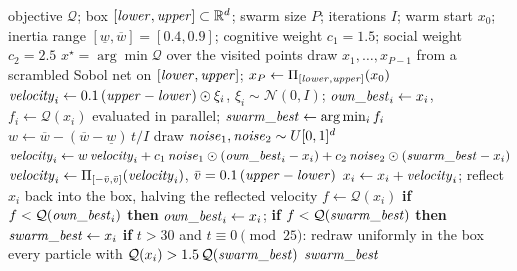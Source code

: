 \begin{algorithm}[H]
\caption{\textsc{ParticleSwarm}: particle swarm minimisation of $\mathcal{Q}$ over a box}
\label{alg:pso}
\small
\begin{algorithmic}[1]
\Require objective $\mathcal{Q}$; box $[\mathit{lower},\mathit{upper}]\subset\mathbb{R}^{d}$; swarm size
  $P$; iterations $I$; warm start $x_0$; inertia range
  $[\underline{w},\overline{w}]=[0.4,0.9]$; cognitive weight $c_1=1.5$; social weight $c_2=2.5$
\Ensure $x^\star=\arg\min \mathcal{Q}$ over the visited points
\State draw $x_1,\dots,x_{P-1}$ from a scrambled Sobol net on $[\mathit{lower},\mathit{upper}]$;\;
  $x_P\gets\Pi_{[\mathit{lower},\mathit{upper}]}(x_0)$
\State $\mathit{velocity}_i\gets 0.1\,(\mathit{upper}-\mathit{lower})\odot\xi_i$, $\xi_i\sim\mathcal N(0,I)$; \; $\mathit{own\_best}_i\gets x_i$, $f_i\gets\mathcal{Q}(x_i)$ evaluated in
  parallel; \; $\mathit{swarm\_best}\gets\arg\min_i f_i$
    \State $w\gets\overline{w}-(\overline{w}-\underline{w})\,t/I$
        \State draw $\mathit{noise}_1,\mathit{noise}_2\sim U[0,1]^d$
        \State $\mathit{velocity}_i\gets w\,\mathit{velocity}_i+c_1\, \mathit{noise}_1\odot(\mathit{own\_best}_i-x_i)+c_2\, \mathit{noise}_2\odot(\mathit{swarm\_best}-x_i)$
        \State $\mathit{velocity}_i\gets\Pi_{[-\bar v,\bar v]}(\mathit{velocity}_i)$, \; $\bar v=0.1\,(\mathit{upper}-\mathit{lower})$
        \State $x_i\gets x_i+\mathit{velocity}_i$; reflect $x_i$ back into the box, halving the
          reflected velocity
        \State $f\gets\mathcal{Q}(x_i)$
        \State \textbf{if} $f<\mathcal{Q}(\mathit{own\_best}_i)$ \textbf{then} $\mathit{own\_best}_i\gets x_i$;\;
          \textbf{if} $f<\mathcal{Q}(\mathit{swarm\_best})$ \textbf{then} $\mathit{swarm\_best}\gets x_i$
    \EndFor
    \State \textbf{if} $t>30$ and $t\equiv 0 \pmod{25}$: redraw uniformly in the box every particle with $\mathcal{Q}(x_i)>1.5\,\mathcal{Q}(\mathit{swarm\_best})$
\EndFor
\State \Return $\mathit{swarm\_best}$
\end{algorithmic}
\end{algorithm}

